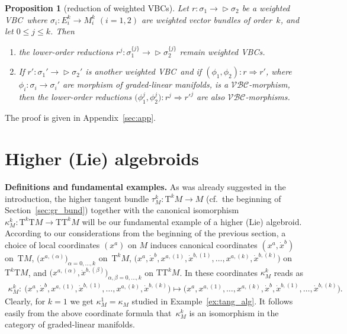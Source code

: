 \documentclass[10pt,a4paper]{amsart}
\newcommand{\ZM}{{VBC}} %
\newcommand{\degree}{{order}}
\newcommand{\ra}{\rightarrow}
\newcommand{\mZM}{\Rightarrow}
\newcommand{\T}{\mathrm{T}} %
\newcommand{\TT}[1]{\mathrm{T}^{#1}} %
\newcommand{\catZM}{{\mathcal{VBC}}} %
\def\relto{\rightarrow\!\!\vartriangleright} %
\numberwithin{equation}{section}
\newtheorem{prop}[thm]{Proposition}
\theoremstyle{definition}
\begin{document}
\begin{prop}[reduction of weighted \ZM s]\label{prop:red_h_to_l} Let $r\colon \sigma_1\relto \sigma_2$ be a weighted \ZM\ where $\sigma_i\colon E_i^k\ra M_i^k$ $(i=1, 2)$ are weighted vector bundles of \degree\ $k$, and let $0\leq j\leq k$. Then
\begin{enumerate}[$(i)$]\itemsep=0pt
 \item \label{prop:red_h_to_l:i1} the lower-order reductions $r^j\colon \sigma^{\{j\}}_1\relto \sigma^{\{j\}}_2$ remain weighted \ZM s.
 \item \label{prop:red_h_to_l:i2} If $r'\colon \sigma_1' \relto \sigma_2'$ is another weighted \ZM\ and if $(\phi_1, \phi_2)\colon r \mZM r'$, where $\phi_i\colon \sigma_i \ra \sigma_i'$ are morphism of graded-linear manifolds, is a $\catZM$-morphism, then the lower-order reductions $\big(\phi_1^j, \phi_2^j\big)\colon r^j \mZM {r'}^j$ are also $\catZM$-morphisms.
\end{enumerate}
\end{prop}

 The proof is given in Appendix~\ref{sec:app}.

\section{Higher (Lie) algebroids}\label{sec:high_alg}

{\bf Definitions and fundamental examples.} As was already suggested in the introduction, the higher tangent bundle $\tau^k_M\colon \TT{k} M\ra M$ (cf.\ the beginning of Section~\ref{sec:gr_bund}) together with the canonical isomorphism $\kappa^k_M\colon \TT{k} \T M\ra \T \TT{k} M$ will be our fundamental example of a higher (Lie) algebroid. According to our considerations from the beginning of the previous section, a choice of local coordinates $(x^a)$ on $M$ induces canonical coordinates $(x^a,\dot x^b)$ on~$\T M$, $\big(x^{a,(\alpha)}\big)_{\alpha=0,\hdots,k}$ on~$\TT{k} M$, $\big(x^{a},\dot x^{b},x^{a,(1)},\dot x^{b,(1)},\hdots,x^{a,(k)},\dot x^{b, (k)}\big)$ on $\TT{k}\T M$, and $\big(x^{a,(\alpha)},\dot x^{b,(\beta)}\big)_{\alpha,\beta=0,\hdots,k}$ on $\T\TT{k} M$. In these coordinates $\kappa^k_M$ reads as
\begin{gather*} \kappa^k_M\colon \ \big(x^{a},\dot x^{b},x^{a,(1)},\dot x^{b,(1)},\hdots,x^{a,(k)},\dot x^{b, (k)}\big)\longmapsto \big(x^{a},x^{a,(1)},\hdots,x^{a,(k)},\dot x^{b},\dot x^{b,(1)},\hdots,\dot x^{b,(k)}\big).\end{gather*}
Clearly, for $k=1$ we get $\kappa^1_M=\kappa_M$ studied in Example~\ref{ex:tang_alg}. It follows easily from the above coordinate formula that~$\kappa^k_M$ is an isomorphism in the category of graded-linear manifolds.
\end{document}

